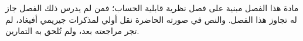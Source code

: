 \documentclass[../../../include/open-logic-chapter]{subfiles}
\begin{document}
\begin{editorial}
  مادة هذا الفصل مبنية على فصل نظرية قابلية الحساب؛ فمن لم يدرس ذلك
  الفصل جاز له تجاوز هذا الفصل. والنص في صورته الحاضرة نقل أولي
  لمذكرات جيريمي أفيغاد، لم تجر مراجعته بعد، ولم تُلحق به التمارين.
\end{editorial}












\OLEndChapterHook
\end{document}
